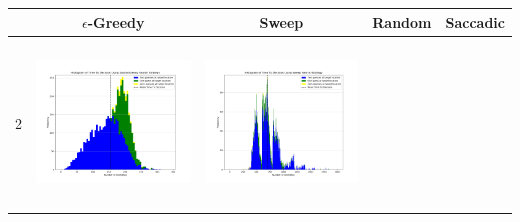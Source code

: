 \begin{landscape}
\begin{table}[h!]
  \centering
  \begin{tabular}{ | c | c | c | c | c |}
    \hline
    & $\epsilon$-Greedy & Sweep & Random & Saccadic \\
    \hline
    2 & \vline
    \begin{minipage}[c][45mm][c]{45mm}
      \includegraphics[width=44mm, height=44mm]{Chapters/MultiAgentTargetDetection/Figs/Histograms/MultipleAgent/2/2EpsilonGreedyHistogram.png}
    \end{minipage}
    &
    \begin{minipage}[c][45mm][c]{45mm}
      \includegraphics[width=44mm, height=44mm]{Chapters/MultiAgentTargetDetection/Figs/Histograms/MultipleAgent/2/2SweepHistogram.png}


\end{minipage}
\end{tabular}
\end{table}
\end{landscape}
